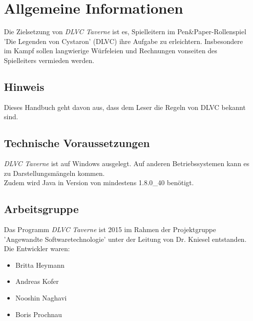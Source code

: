 \documentclass[11pt, a4paper, german]{article}
\begin{document}

\clearpage

\tableofcontents
\pagebreak
\section{Allgemeine Informationen}
Die Zielsetzung von \textit{DLVC Taverne} ist es, Spielleitern im Pen\&Paper-Rollenspiel 'Die Legenden von Cystaron' (DLVC) ihre Aufgabe zu erleichtern. Insbesondere im Kampf sollen langwierige Würfeleien und Rechnungen vonseiten des Spielleiters vermieden werden.
\subsection{Hinweis}
Dieses Handbuch geht davon aus, dass dem Leser die Regeln von DLVC bekannt sind. 
\subsection{Technische Voraussetzungen}
\textit{DLVC Taverne} ist auf Windows ausgelegt. Auf anderen Betriebssystemen kann es zu Darstellungsmängeln kommen. \\
Zudem wird Java in Version von mindestens 1.8.0\_40 benötigt.
\subsection{Arbeitsgruppe}
Das Programm \textit{DLVC Taverne} ist 2015 im Rahmen der Projektgruppe 'Angewandte Softwaretechnologie' unter der Leitung von Dr. Kniesel entstanden. Die Entwickler waren:
\begin{itemize}
	\item[] Britta Heymann
	\item[] Andreas Kofer
	\item[] Nooshin Naghavi
	\item[] Boris Prochnau
\end{itemize}

\newpage
\end{document}
